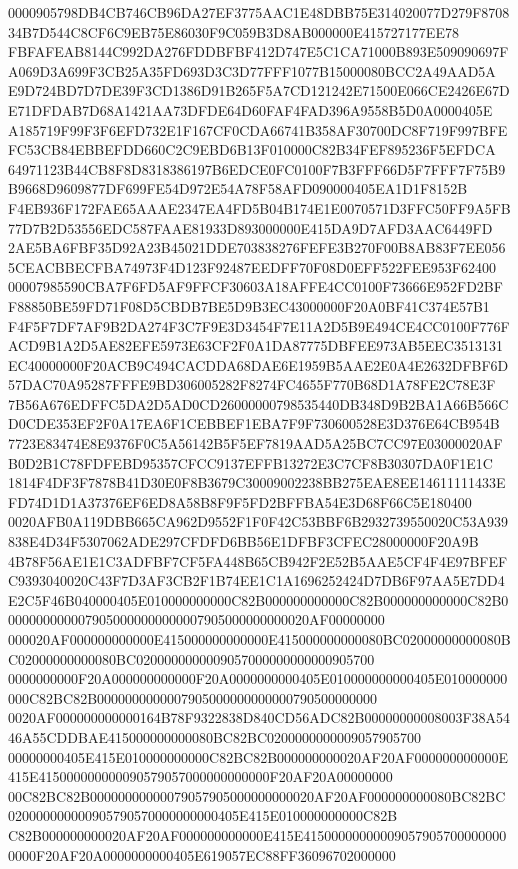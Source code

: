 \documentclass[UTF8,fontset=fandol,zihao=-4,a4paper]{ctexart}
\begin{document}
{{0000905798DB4CB746CB96DA27EF3775AAC1E48DBB75E314020077D279F870834B7D544C8CF6C9EB75E86030F9C059B3D8AB000000E415727177EE78
FBFAFEAB8144C992DA276FDDBFBF412D747E5C1CA71000B893E509090697FA069D3A699F3CB25A35FD693D3C3D77FFF1077B15000080BCC2A49AAD5A
E9D724BD7D7DE39F3CD1386D91B265F5A7CD121242E71500E066CE2426E67DE71DFDAB7D68A1421AA73DFDE64D60FAF4FAD396A9558B5D0A0000405E
A185719F99F3F6EFD732E1F167CF0CDA66741B358AF30700DC8F719F997BFEFC53CB84EBBEFDD660C2C9EBD6B13F010000C82B34FEF895236F5EFDCA
64971123B44CB8F8D8318386197B6EDCE0FC0100F7B3FFF66D5F7FFF7F75B9B9668D9609877DF699FE54D972E54A78F58AFD090000405EA1D1F8152B
F4EB936F172FAE65AAAE2347EA4FD5B04B174E1E0070571D3FFC50FF9A5FB77D7B2D53556EDC587FAAE81933D893000000E415DA9D7AFD3AAC6449FD
2AE5BA6FBF35D92A23B45021DDE703838276FEFE3B270F00B8AB83F7EE0565CEACBBECFBA74973F4D123F92487EEDFF70F08D0EFF522FEE953F62400
00007985590CBA7F6FD5AF9FFCF30603A18AFFE4CC0100F73666E952FD2BFF88850BE59FD71F08D5CBDB7BE5D9B3EC43000000F20A0BF41C374E57B1
F4F5F7DF7AF9B2DA274F3C7F9E3D3454F7E11A2D5B9E494CE4CC0100F776FACD9B1A2D5AE82EFE5973E63CF2F0A1DA87775DBFEE973AB5EEC3513131
EC40000000F20ACB9C494CACDDA68DAE6E1959B5AAE2E0A4E2632DFBF6D57DAC70A95287FFFE9BD306005282F8274FC4655F770B68D1A78FE2C78E3F
7B56A676EDFFC5DA2D5AD0CD26000000798535440DB348D9B2BA1A66B566CD0CDE353EF2F0A17EA6F1CEBBEF1EBA7F9F730600528E3D376E64CB954B
7723E83474E8E9376F0C5A56142B5F5EF7819AAD5A25BC7CC97E03000020AFB0D2B1C78FDFEBD95357CFCC9137EFFB13272E3C7CF8B30307DA0F1E1C
1814F4DF3F7878B41D30E0F8B3679C30009002238BB275EAE8EE14611111433EFD74D1D1A37376EF6ED8A58B8F9F5FD2BFFBA54E3D68F66C5E180400
0020AFB0A119DBB665CA962D9552F1F0F42C53BBF6B2932739550020C53A939838E4D34F5307062ADE297CFDFD6BB56E1DFBF3CFEC28000000F20A9B
4B78F56AE1E1C3ADFBF7CF5FA448B65CB942F2E52B5AAE5CF4F4E97BFEFC9393040020C43F7D3AF3CB2F1B74EE1C1A1696252424D7DB6F97AA5E7DD4
E2C5F46B040000405E010000000000C82B000000000000C82B000000000000C82B00000000000079050000000000007905000000000020AF00000000
000020AF000000000000E415000000000000E415000000000080BC02000000000080BC02000000000080BC0200000000009057000000000000905700
0000000000F20A000000000000F20A0000000000405E010000000000405E010000000000C82BC82B0000000000007905000000000000790500000000
0020AF000000000000164B78F9322838D840CD56ADC82B00000000008003F38A5446A55CDDBAE415000000000080BC82BC0200000000009057905700
00000000405E415E010000000000C82BC82B000000000020AF20AF000000000000E415E415000000000090579057000000000000F20AF20A00000000
00C82BC82B00000000000079057905000000000020AF20AF000000000080BC82BC020000000000905790570000000000405E415E010000000000C82B
C82B000000000020AF20AF000000000000E415E415000000000090579057000000000000F20AF20A0000000000405E619057EC88FF36096702000000
}}
\end{document}
